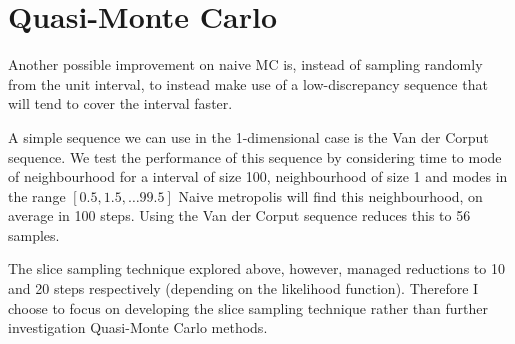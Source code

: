 \section{Quasi-Monte Carlo}
Another possible improvement on naive MC is, instead of sampling randomly from the unit interval, to instead make use of a low-discrepancy sequence that will tend to cover the interval faster.

A simple sequence we can use in the 1-dimensional case is the Van der Corput sequence.
We test the performance of this sequence by considering time to mode of neighbourhood for a interval of size 100, neighbourhood of size 1 and modes in the range $[0.5, 1.5, \ldots 99.5]$
Naive metropolis will find this neighbourhood, on average in 100 steps. Using the Van der Corput sequence reduces this to 56 samples. 

The slice sampling technique explored above, however,  managed reductions to 10 and 20 steps respectively (depending on the likelihood function). Therefore I choose to focus on developing the slice sampling technique rather than further investigation Quasi-Monte Carlo methods.


